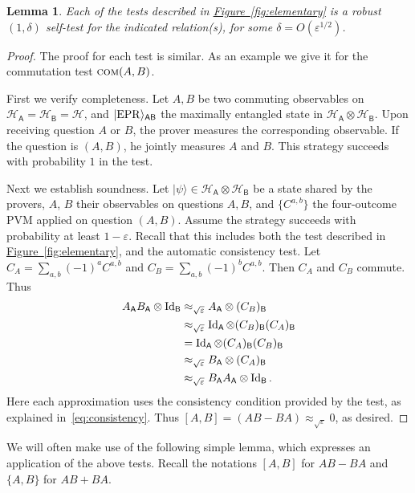 \documentclass[11pt]{article}
\numberwithin{equation}{section}
\newtheorem{lemma}[theorem]{Lemma}
\theoremstyle{definition}
\theoremstyle{plain}
\newcommand{\expref}[2]{\hyperref[#2]{#1~\ref{#2}}}
\newcommand{\ket}[1]{|#1\rangle}
\newcommand{\Id}{\ensuremath{\mathop{\rm Id}\nolimits}}
\newcommand{\reg}[1]{{\textsf{#1}}}
\newcommand{\mH}{\mathcal{H}}
\newcommand{\eps}{\varepsilon}
\newcommand{\EPR}{{\rm EPR}}
\newcommand{\comt}{\textsc{com}}
\begin{document}
\begin{lemma}\label{lem:elementary}
Each of the tests described in \expref{Figure}{fig:elementary} is a robust $(1,\delta)$ self-test for the indicated relation(s), for some $\delta = O(\eps^{1/2})$. 
\end{lemma}

\begin{proof}
The proof for each test is similar. As an example we give it for the commutation test $\comt(A,B)$. 

First we verify completeness. Let $A,B$ be two commuting observables on $\mH_{\reg{A}} = \mH_{\reg{B}} = \mH$, and $\ket{\EPR}_{\reg{AB}}$ the maximally entangled state in $\mH_\reg{A}\otimes \mH_\reg{B}$. Upon receiving question $A$ or $B$, the prover measures the corresponding observable. If the question is $(A,B)$, he jointly measures $A$ and $B$. This strategy succeeds with probability $1$ in the test. 

Next we establish soundness. Let $\ket{\psi} \in \mH_{\reg{A}}\otimes \mH_\reg{B}$ be a state shared by the provers, $A$, $B$ their observables on questions $A,B$, and $\{C^{a,b}\}$ the four-outcome PVM applied on question $(A,B)$. Assume the strategy succeeds with probability at least $1-\eps$. Recall that this includes both the test described in \expref{Figure}{fig:elementary}, and the automatic consistency test. Let $C_A = \sum_{a,b} (-1)^a C^{a,b}$ and $C_B = \sum_{a,b} (-1)^b C^{a,b}$. Then $C_A$ and $C_B$ commute. Thus
\begin{align*}
A_\reg{A} B_\reg{A} \otimes \Id_\reg{B}
&\approx_{\sqrt{\eps}} A_\reg{A} \otimes (C_B)_\reg{B}\\
&\approx_{\sqrt{\eps}} \Id_\reg{A} \otimes (C_B)_\reg{B}(C_A)_\reg{B}\\
&=  \Id_\reg{A} \otimes (C_A)_\reg{B}(C_B)_\reg{B}\\
&\approx_{\sqrt{\eps}} B_\reg{A} \otimes (C_A)_\reg{B}\\
&\approx_{\sqrt{\eps}} B_\reg{A} A_\reg{A} \otimes \Id_\reg{B}.
\end{align*}
Here each approximation uses the consistency condition provided by the test, as explained in~\eqref{eq:consistency}. Thus $[A,B] = (AB-BA) \approx_{\sqrt{\eps}} 0$, as desired. 
\end{proof}

We will often make use of the following simple lemma, which expresses an application of the above tests. Recall the notations $[A,B]$ for $AB-BA$ and $\{A,B\}$ for $AB+BA$. 
\end{document}
